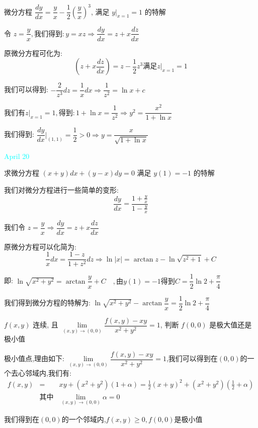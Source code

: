 \begin{example}[][Exam: 30.3.10]
	微分方程 $\dfrac{dy}{dx}=\dfrac{y}{x}-\dfrac{1}{2}(\dfrac{y}{x})^3$, 满足 $y\big|_{x=1} = 1$ 的特解
\end{example}


\begin{solution}
	
	令 $z=\dfrac{y}{x},\text{我们得到}: y=xz\Rightarrow \dfrac{dy}{dx}=z+x\dfrac{dz}{dx}$
	
	原微分方程可化为: 
	$$(z+x\frac{dz}{dx})=z-\frac{1}{2}z^3\text{满足} z| _{x=1}=1$$
	
	我们可以得到: $-\dfrac{2}{z^3}dz=\dfrac{1}{x}dx\Rightarrow \dfrac{1}{z^2}=\ln x+c$
	
	$\text{我们有}z| _{x=1}=1,\text{得到}: 1+\ln x=\dfrac{1}{z^2}\Rightarrow y^2=\dfrac{x^2}{1+\ln x}$
	
	我们得到: $\dfrac{dy}{dx}|_{(1,1)}=\dfrac{1}{2}>0\Rightarrow y=\dfrac{x}{\sqrt{1+\ln x}}$
\end{solution}


\textcolor{cyan}{April 20}

\begin{example}[][Exam: 30.3.11]
	求微分方程 $(x+y)dx+(y-x)dy=0$ 满足 $y(1)=-1$ 的特解
\end{example}

\begin{solution}
	
	我们对微分方程进行一些简单的变形: 
	$$\frac{dy}{dx}=\dfrac{1+\frac{y}{x}}{1-\frac{y}{x}}$$
	
	我们令 $z=\dfrac{y}{x}\Rightarrow \dfrac{dy}{dx}=z+x\dfrac{dz}{dx}$
	
	原微分方程可以化简为: 
	$$\frac{1}{x}dx=\frac{1-z}{1+z^2}dz\Rightarrow \ln |x|=\arctan z-\ln \sqrt{z^2+1}+C$$
	
	即: $\ln\sqrt{x^2+y^2}=\arctan \dfrac{y}{x}+C\quad ,\text{由}y(1)=-1\text{得到} C=\dfrac{1}{2}\ln 2+\dfrac{\pi}{4}$
	
	我们得到微分方程的特解为: $\ln\sqrt{x^2+y^2}-\arctan \dfrac{y}{x}=\dfrac{1}{2}\ln 2+\dfrac{\pi}{4}$
\end{solution}

\begin{example}[][Exam: 30.3.12]
	$f(x,y)$ 连续, 且 $\lim\limits_{(x,y)\to (0,0)}\dfrac{f(x,y)-xy}{x^2+y^2}=1$, 判断 $f(0,0)$ 是极大值还是极小值 
\end{example}

\begin{solution}
	
	极小值点,理由如下: 
	$\lim\limits_{(x,y)\to (0,0)}\dfrac{f(x,y)-xy}{x^2+y^2}=1$,我们可以得到在$(0,0)$的一个去心邻域内,我们有: 
	\begin{eqnarray*}
		f(x,y)&=&xy+(x^2+y^2)(1+\alpha)=\frac{1}{2}(x+y)^2+(x^2+y^2)(\frac{1}{2}+\alpha)\\
		&\text{其中}&\lim\limits_{(x,y)\to (0,0)}\alpha=0
	\end{eqnarray*}

	我们得到在$(0,0)$的一个邻域内,$f(x,y)\geq 0,f(0,0)\text{是极小值}$
\end{solution}



